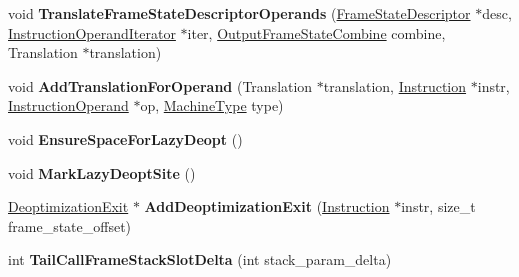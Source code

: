 \begin{DoxyCompactItemize}
\item 
void {\bfseries Translate\+Frame\+State\+Descriptor\+Operands} (\hyperlink{classv8_1_1internal_1_1compiler_1_1_frame_state_descriptor}{Frame\+State\+Descriptor} $\ast$desc, \hyperlink{classv8_1_1internal_1_1compiler_1_1_instruction_operand_iterator}{Instruction\+Operand\+Iterator} $\ast$iter, \hyperlink{classv8_1_1internal_1_1compiler_1_1_output_frame_state_combine}{Output\+Frame\+State\+Combine} combine, Translation $\ast$translation)\hypertarget{classv8_1_1internal_1_1compiler_1_1_code_generator_ac1bbf8d85359af7c1fa8a2e23953049b}{}\label{classv8_1_1internal_1_1compiler_1_1_code_generator_ac1bbf8d85359af7c1fa8a2e23953049b}

\item 
void {\bfseries Add\+Translation\+For\+Operand} (Translation $\ast$translation, \hyperlink{classv8_1_1internal_1_1compiler_1_1_instruction}{Instruction} $\ast$instr, \hyperlink{classv8_1_1internal_1_1compiler_1_1_instruction_operand}{Instruction\+Operand} $\ast$op, \hyperlink{classv8_1_1internal_1_1_machine_type}{Machine\+Type} type)\hypertarget{classv8_1_1internal_1_1compiler_1_1_code_generator_a40c7212692731c3863a5e57adaf7e1f8}{}\label{classv8_1_1internal_1_1compiler_1_1_code_generator_a40c7212692731c3863a5e57adaf7e1f8}

\item 
void {\bfseries Ensure\+Space\+For\+Lazy\+Deopt} ()\hypertarget{classv8_1_1internal_1_1compiler_1_1_code_generator_a1ac8ec2aa284e831b4a706eb9922d622}{}\label{classv8_1_1internal_1_1compiler_1_1_code_generator_a1ac8ec2aa284e831b4a706eb9922d622}

\item 
void {\bfseries Mark\+Lazy\+Deopt\+Site} ()\hypertarget{classv8_1_1internal_1_1compiler_1_1_code_generator_a160c7d38ff547b0766eb38b59341e324}{}\label{classv8_1_1internal_1_1compiler_1_1_code_generator_a160c7d38ff547b0766eb38b59341e324}

\item 
\hyperlink{classv8_1_1internal_1_1compiler_1_1_deoptimization_exit}{Deoptimization\+Exit} $\ast$ {\bfseries Add\+Deoptimization\+Exit} (\hyperlink{classv8_1_1internal_1_1compiler_1_1_instruction}{Instruction} $\ast$instr, size\+\_\+t frame\+\_\+state\+\_\+offset)\hypertarget{classv8_1_1internal_1_1compiler_1_1_code_generator_afd793a7b97a91e2ea4b78b61ac83e21e}{}\label{classv8_1_1internal_1_1compiler_1_1_code_generator_afd793a7b97a91e2ea4b78b61ac83e21e}

\item 
int {\bfseries Tail\+Call\+Frame\+Stack\+Slot\+Delta} (int stack\+\_\+param\+\_\+delta)\hypertarget{classv8_1_1internal_1_1compiler_1_1_code_generator_a9ac6e47ee7a44e3f41d7534bbb07dcda}{}\label{classv8_1_1internal_1_1compiler_1_1_code_generator_a9ac6e47ee7a44e3f41d7534bbb07dcda}

\end{DoxyCompactItemize}
